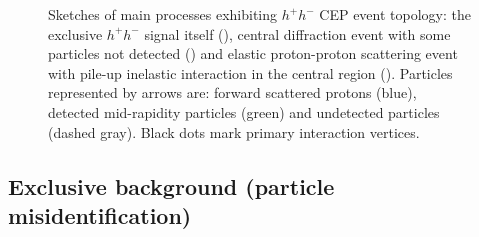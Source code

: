 \begin{figure}[h]
{  \begin{subfigure}[b]{0.9\linewidth}{
                }
  \end{subfigure} 
}%
\caption[Sketches of main processes with CEP event topology.]{Sketches of main processes exhibiting $h^{+}h^{-}$ CEP event topology: the exclusive $h^{+}h^{-}$ signal itself (), central diffraction event with some particles not detected () and elastic proton-proton scattering event with pile-up inelastic interaction in the central region (). Particles represented by arrows are: forward scattered protons (blue), detected mid-rapidity particles (green) and undetected particles (dashed gray). Black dots mark primary interaction vertices.}\label{fig:bkgdSources}
\end{figure}
 
 

\newpage
\subsection{Exclusive background (particle misidentification)}\label{sec:exclBkgd}


